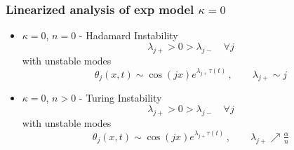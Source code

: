 \documentclass{beamer}
\begin{document}
\begin{frame}\frametitle{Linearized analysis of exp model $\kappa = 0$}


{\small 

\begin{itemize}
\item
$\kappa = 0$, $n = 0$  -  {\color{red} Hadamard Instability} \\
$$
\lambda_{j +}  > 0 >  \lambda_{j -}  \quad \forall j
$$
with unstable modes
$$
\theta_j (x,t) \sim \cos (j  x) e^{\lambda_{j +} \tau (t)} \, , \qquad \lambda_{j +} \sim j 
$$


\item
$\kappa = 0$, $n > 0$  -  {\color{red} Turing Instability} \\
$$
\lambda_{j +}  > 0 >  \lambda_{j -}  \quad \forall j
$$
with unstable modes
$$
\theta_j (x,t) \sim \cos (j  x) e^{\lambda_{j +} \tau (t)} \, , \qquad \lambda_{j +} \nearrow \tfrac{\alpha}{n}
$$



\end{itemize}
}

\end{frame}
\end{document}
